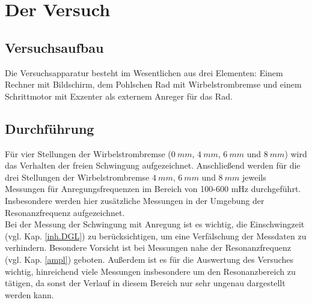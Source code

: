 \section{Der Versuch}
\subsection{Versuchsaufbau}
Die Versuchsapparatur besteht im Wesentlichen aus drei Elementen: Einem Rechner mit Bildschirm, dem Pohlschen Rad mit 
Wirbelstrombremse und einem Schrittmotor mit Exzenter als externem Anreger für das Rad.

\subsection{Durchführung}
Für vier Stellungen der Wirbelstrombremse ($\SI{0}{mm}$, $\SI{4}{mm}$, $\SI{6}{mm}$ und $\SI{8}{mm}$) wird das Verhalten der freien Schwingung aufgezeichnet. Anschließend werden für die drei Stellungen der Wirbelstrombremse $\SI{4}{mm}$, $\SI{6}{mm}$ und $\SI{8}{mm}$
jeweils Messungen für Anregungsfrequenzen im Bereich von 100-600 mHz durchgeführt. Insbesondere werden hier zusätzliche 
Messungen in der Umgebung der Resonanzfrequenz aufgezeichnet.\\
Bei der Messung der Schwingung mit Anregung ist es wichtig, die Einschwingzeit (vgl. Kap. \ref{inh.DGL}) zu berücksichtigen, um eine Verfälschung der 
Messdaten zu verhindern. Besondere Vorsicht ist bei Messungen nahe der Resonanzfrequenz (vgl. Kap. \ref{ampl}) geboten. Außerdem ist es für die
Auswertung des Versuches wichtig, hinreichend viele Messungen insbesondere um den Resonanzbereich zu tätigen, da sonst der 
Verlauf in diesem Bereich nur sehr ungenau dargestellt werden kann.

